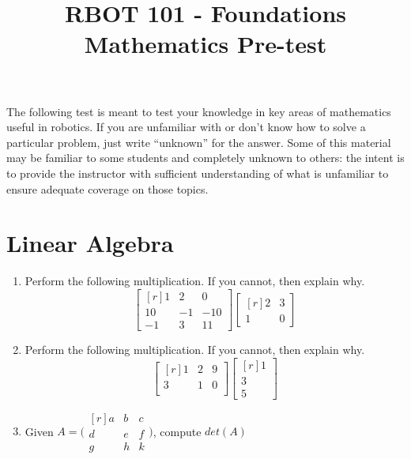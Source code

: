 \documentclass{article}
\title{RBOT 101 - Foundations Mathematics Pre-test}
\begin{document}
\maketitle
The following test is meant to test your knowledge in key areas of mathematics useful in robotics. If you are unfamiliar with or don't know how to solve a particular problem, just write ``unknown'' for the answer. Some of this material may be familiar to some students and completely unknown to others: the intent is to provide the instructor with sufficient understanding of what is unfamiliar to ensure adequate coverage on those topics.
\section{Linear Algebra}
\begin{enumerate}[\thesection .1]
\item Perform the following multiplication. If you cannot, then explain why.
  \begin{equation*}
    \begin{bmatrix*}[r]
       1 & 2 & 0 \\
       10 & -1 & -10 \\
       -1 & 3 & 11
    \end{bmatrix*}
    \begin{bmatrix*}[r]
      2 & 3 \\
      1 & 0
    \end{bmatrix*}
  \end{equation*}

\item Perform the following multiplication. If you cannot, then explain why.
  \begin{equation*}
    \begin{bmatrix*}[r]
      1 & 2 & 9 \\
      3 & 1 & 0 \\
    \end{bmatrix*}
    \begin{bmatrix*}[r]
      1 \\
      3 \\
      5
    \end{bmatrix*}
  \end{equation*}

\item Given $A = \big(\begin{smallmatrix*}[r] a & b & c\\ d & e & f\\ g & h & k \end{smallmatrix*}\big)$, compute
  $det(A)$


\end{enumerate}
\end{document}
